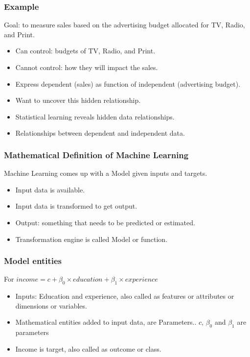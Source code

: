 \begin{frame}[fragile]\frametitle{Example}
 Goal: to measure sales based on the advertising budget allocated for TV, Radio, and Print.
\begin{itemize}
\item Can control: budgets of TV, Radio, and Print. 
\item Cannot control: how they will impact the sales. 
\item Express dependent (sales) as function of independent (advertising budget). 
\item Want to uncover this hidden relationship.
\item Statistical learning reveals hidden data relationships. 
\item Relationships between dependent and independent data.
\end{itemize}
\end{frame}

\begin{frame}[fragile]\frametitle{Mathematical Definition of Machine Learning}
Machine Learning comes up with a Model given inputs and targets.

\begin{itemize}
\item Input data is available. 
\item Input data is transformed to get output.
\item Output: something that needs to be predicted or estimated.
\item Transformation engine is called Model or function.
\end{itemize}
\end{frame}

\begin{frame}[fragile]\frametitle{Model entities}
For $income = c + \beta_0 \times education + \beta_1 \times experience$
\begin{itemize}
\item Inputs: Education and experience, also called as features or attributes or dimensions or variables.
\item Mathematical entities added to input data, are Parameters.. $c$, $\beta_0$ and $\beta_1$ are parameters
\item Income is target, also called as outcome or class.
\end{itemize}
\end{frame}

